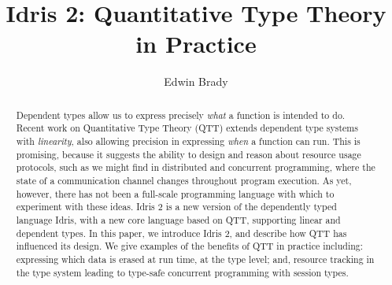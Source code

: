 \documentclass[a4paper,UKenglish,cleveref, autoref, thm-restate]{lipics-v2019}
\title{Idris 2: Quantitative Type Theory in Practice} %
\author{Edwin Brady}
{School of Computer Science, University of St Andrews, Scotland, UK \and \url{http://www.type-driven.org.uk/edwinb}}
{ecb10@st-andrews.ac.uk}{https://orcid.org/0000-0002-9734-367X}
{}%
\begin{document}
\maketitle

\begin{abstract}
    Dependent types allow us to express precisely \emph{what} a function is
    intended to do.  Recent work on Quantitative Type Theory (QTT) extends
    dependent type systems with \emph{linearity}, also allowing precision in
    expressing \emph{when} a function can run.
    This is promising, because it suggests the ability to design and
    reason about resource usage protocols, such as we might find in
    distributed and concurrent programming, where the state of a communication
    channel changes throughout program execution.
    As yet, however, there has not been a full-scale programming language with
    which to experiment with these ideas.
    Idris 2 is a new version of the dependently typed language Idris, with a
    new core language based on QTT, supporting linear and dependent types.  In
    this paper, we introduce Idris 2, and describe how QTT has influenced its
    design. We give examples of the benefits of QTT in practice including:
    expressing which data is erased at run time, at the type level; and,
    resource tracking in the type system leading to type-safe concurrent
    programming with session types.
\end{abstract}










\end{document}

